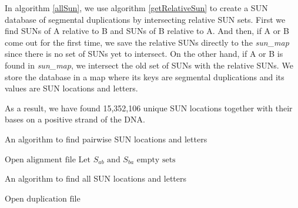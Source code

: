 In algorithm \ref{allSun}, we use algorithm \ref{getRelativeSun} to create a SUN database of segmental duplications by intersecting relative SUN sets. First we find SUNs of A relative to B and SUNs of B relative to A. And then, if A or B come out for the first time, we save the relative SUNs directly to the \textit{sun\_map} since there is no set of SUNs yet to intersect. On the other hand, if A or B is found in \textit{sun\_map}, we intersect the old set of SUNs with the relative SUNs. We store the database in a map where its keys are segmental duplications and its values are SUN locations and letters.

As a result, we have found 15,352,106 unique SUN locations together with their bases on a positive strand of the DNA. 

\begin{algorithm}
\caption{An algorithm to find pairwise SUN locations and letters}
\label{getRelativeSun}
\begin{algorithmic}[1]
\State $\text{Open alignment file}$
\State $\text{Let } S_{ab} \text{ and } S_{ba} \text{ empty sets}$
\EndIf
{}
\EndIf
{}
\EndIf
{}
\EndIf
\EndIf
\EndFor
\EndWhile
\EndIf
\EndProcedure
\end{algorithmic}
\end{algorithm}


\begin{algorithm}
\caption{An algorithm to find all SUN locations and letters}
\label{allSun}
\begin{algorithmic}[1]
\State $\text{Open duplication file}$
\Else
{}
\EndIf
{}
\Else
{}
\EndIf
\EndFor
\EndIf
\EndProcedure
\end{algorithmic}
\end{algorithm}
